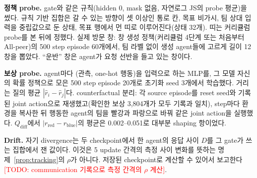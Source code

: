 \documentclass[twocolumn,10pt]{article}
\theoremstyle{remark}
\newcommand{\todo}[1]{\textcolor{red}{[TODO: #1]}}
\begin{document}
\textbf{정책 probe.} gate와 같은 규칙(hidden 0, mask 없음, 자연로그 JS의 probe 평균)을 썼다. 규칙 기반 집합은 갈 수 있는 방향이
셋 이상인 통로 칸, 목표 비가시, 팀 상대 입력을 중립값으로 둔 상태, 목표 행에서 먼 띠로 이루어진다(상태 32개). 띠는 커리큘럼 probe를
본 뒤에 정했다. 실제 방문 창: 창 생성 정책(커리큘럼 4단계 또는 처음부터 All-peer)의 500 step episode 60개에서, 팀 라벨 없이 생성
agent들에 고르게 길이 12 창을 뽑았다. ``운반'' 창은 agent가 요청 선반을 들고 있는 창이다.

\textbf{보상 probe.} agent마다 (관측, one-hot 행동)을 입력으로 하는 MLP를, 그 모델 자신의 확률 정책으로 모은 500 step episode 20개로
초기화 seed 3개에서 학습했다. 거리는 질의 평균 $|\hat r_i-\hat r_j|$다. counterfactual 분리: 각 source episode를 reset seed와 기록된
joint action으로 재생했고(확인한 보상 3{,}804개가 모두 기록과 일치), step마다 환경을 복사한 뒤 행동한 agent의 팀을 빨강과 파랑으로
바꿔 같은 joint action을 실행했다. $Q_{\mathrm{diff}}$에서 $|r_{\mathrm{red}}-r_{\mathrm{blue}}|$의 평균은 0.002--0.051로 대부분
shaping 항이었다.

\textbf{Drift.} 자기 divergence는 두 checkpoint에서 한 agent의 응답 사이 $D$를 그 gate가 쓰는 집합에서 잰 값이다. 이것은 5 update
간격의 측정 사이 변화를 뜻하는 명제~\ref{prop:tracking}의 $\rho$가 아니다. 저장된 checkpoint로 계산할 수 있어서 보고한다
\todo{communication 기록으로 측정 간격의 $\rho$ 계산}.
\end{document}
